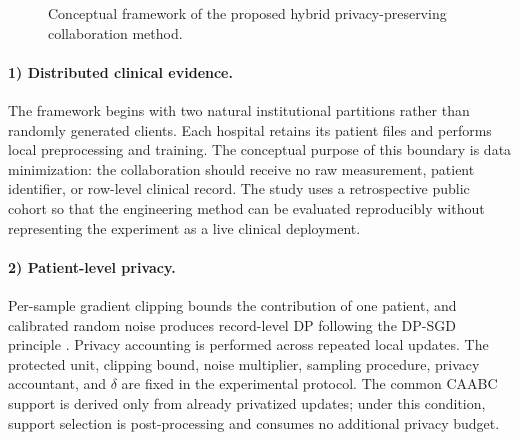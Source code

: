 \begin{figure}[htbp]
{%
}
\caption{Conceptual framework of the proposed hybrid privacy-preserving collaboration method.}
\label{fig:conceptual-framework}
\end{figure}

\paragraph{1) Distributed clinical evidence.}
The framework begins with two natural institutional partitions rather than randomly generated clients. Each hospital retains its patient files and performs local preprocessing and training. The conceptual purpose of this boundary is data minimization: the collaboration should receive no raw measurement, patient identifier, or row-level clinical record. The study uses a retrospective public cohort so that the engineering method can be evaluated reproducibly without representing the experiment as a live clinical deployment.

\paragraph{2) Patient-level privacy.}
Per-sample gradient clipping bounds the contribution of one patient, and calibrated random noise produces record-level DP following the DP-SGD principle \cite{abadi2016deep}. Privacy accounting is performed across repeated local updates. The protected unit, clipping bound, noise multiplier, sampling procedure, privacy accountant, and $\delta$ are fixed in the experimental protocol. The common CAABC support is derived only from already privatized updates; under this condition, support selection is post-processing and consumes no additional privacy budget.

